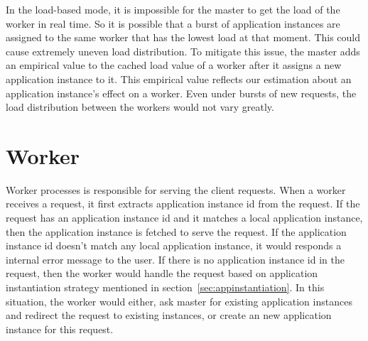 In the load-based mode, it is impossible for the master to get
the load of the worker in real time.
So it is possible that a burst of application instances
are assigned to the same worker that has the lowest load at that moment.
This could cause extremely uneven load distribution.
To mitigate this issue, the master adds an empirical value to the cached
load value of a worker after it assigns a new application instance to it.
This empirical value reflects our estimation about an application instance's 
effect on a worker.
Even under bursts of new requests, 
the load distribution between the workers would not vary greatly.


\section{Worker}

Worker processes is responsible for serving the client requests.
When a worker receives a request,
it first extracts application instance id from the request.
If the request has an application instance id
and it matches a local application instance,
then the application instance is fetched to serve the request.
If the application instance id doesn't match any local application instance,
it would responds a internal error message to the user.
If there is no application instance id 
in the request,
then the worker would handle the request based on application instantiation strategy
mentioned in section~\ref{sec:appinstantiation}.
In this situation,
the worker would either, ask master for existing application instances and
redirect the request to existing instances,
or create an new application instance for this request.



